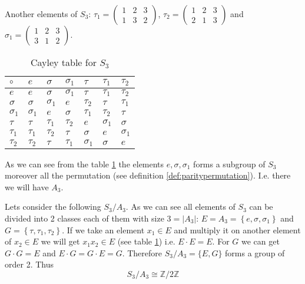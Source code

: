 \begin{appendices}
\begin{example}[$S_3$ group]
  Another elements of $S_3$:
  \(
  \tau_1 = \begin{pmatrix}
    1 & 2 & 3\\
    1 & 3 & 2
  \end{pmatrix}
  \),
  \(
  \tau_2 = \begin{pmatrix}
    1 & 2 & 3\\
    2 & 1 & 3
  \end{pmatrix}
  \) and
  \(
  \sigma_1 = \begin{pmatrix}
    1 & 2 & 3\\
    3 & 1 & 2
  \end{pmatrix}
  \).    

  \begin{table}
    \centering
    \caption{Cayley table for $S_3$ \cite{wiki:permutationgroups}}
    \label{tab:CayleyS3}
    \begin{tabular}{l|llllll}
      \toprule
      $\circ$ & $e$ & $\sigma$ & $\sigma_1$ & $\tau$ & $\tau_1$ & $\tau_2$\\
      \midrule
      $e$ & $e$ & $\sigma$ & $\sigma_1$ & $\tau$ & $\tau_1$ & $\tau_2$\\
      $\sigma$ & $\sigma$ & $\sigma_1$ & $e$ & $\tau_2$ & $\tau$ & $\tau_1$\\
      $\sigma_1$ & $\sigma_1$ & $e$ & $\sigma$ & $\tau_1$ & $\tau_2$ & $\tau$\\
      $\tau$ & $\tau$ & $\tau_1$ & $\tau_2$ & $e$ & $\sigma_1$ & $\sigma$\\
      $\tau_1$ & $\tau_1$ & $\tau_2$ & $\tau$ & $\sigma$ & $e$ & $\sigma_1$\\
      $\tau_2$ & $\tau_2$ & $\tau$ & $\tau_1$ & $\sigma_1$ & $\sigma$ & $e$\\
      \bottomrule
    \end{tabular}
  \end{table}
  As we can see from the table \ref{tab:CayleyS3} the elements $e,
  \sigma, \sigma_1$ forms a subgroup of $S_3$ moreover all the
  permutation (see definition \ref{def:paritypermutation}). I.e. there
  we will have  $A_3$.
  \label{ex:s3group}
\end{example}

\begin{example}
  Lets consider the following 
  $S_3/A_3$. As we can see all elements of $S_3$ can be divided into 2
  classes each of them with size $3 = \left|A_3\right|$: $E= A_3 =
  \left\{e, \sigma, \sigma_1\right\}$ 
  and $G = \left\{\tau, \tau_1, \tau_2\right\}$. If we take an element
  $x_1 \in E$ and multiply it on another element of $x_2 \in E$ we
  will get $x_1 x_2 \in E$ (see table \ref{tab:CayleyS3}) i.e. $E
  \cdot E =
  E$. For $G$ we can get $G \cdot G = E$ and $E \cdot G = G \cdot E =
  G$. Therefore $S_3/A_3 = \{E, G\}$ forms a group of order 2. Thus
  \[
  S_3/A_3 \cong \mathbb{Z}/2\mathbb{Z}
  \]
  \label{ex:s3a3quotientgroup}
\end{example}


\end{appendices}
